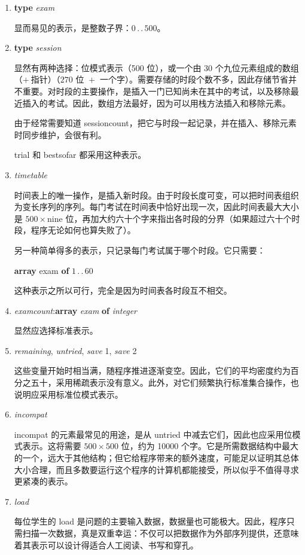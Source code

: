 \begin{enumerate}[wide, nosep, label=(\arabic*)]
	\item \textbf{type} \textit{exam}

	\noindent
	显而易见的表示，是整数子界：$0\,.\,.\,500$。

	\item \textbf{type} \textit{session}

	\noindent
	显然有两种选择：位模式表示（500 位），或一个由 30 个九位元素组成的数组（$+\ \text{指针}$）（$270 \text{ 位 } + \text{ 一个字}$）。需要存储的时段个数不多，因此存储节省并不重要。对时段的主要操作，是插入一门已知尚未在其中的考试，以及移除最近插入的考试。因此，数组方法最好，因为可以用栈方法插入和移除元素。

	由于经常需要知道 sessioncount，把它与时段一起记录，并在插入、移除元素时同步维护，会很有利。

	trial 和 bestsofar 都采用这种表示。

	\item \textit{timetable}

	\noindent
	时间表上的唯一操作，是插入新时段。由于时段长度可变，可以把时间表组织为变长序列的序列。每门考试在时间表中恰好出现一次，因此时间表最大大小是 $500 \times \text{nine}$ 位，再加大约六十个字来指出各时段的分界（如果超过六十个时段，程序无论如何也算失败了）。

	另一种简单得多的表示，只记录每门考试属于哪个时段。它只需要：

	\quad \textbf{array} exam \textbf{of} $1\,.\,.\,60$

	\noindent
	这种表示之所以可行，完全是因为时间表各时段互不相交。

	\item \textit{examcount}:\textbf{array} \textit{exam} \textbf{of} \textit{integer}

	\noindent
	显然应选择标准表示。

	\item \textit{remaining}, \textit{untried}, \textit{save} 1, \textit{save} 2

	\noindent
	这些变量开始时相当满，随程序推进逐渐变空。因此，它们的平均密度约为百分之五十，采用稀疏表示没有意义。此外，对它们频繁执行标准集合操作，也说明应采用标准位模式表示。

	\item \textit{incompat}

	\noindent
	incompat 的元素最常见的用途，是从 untried 中减去它们，因此也应采用位模式表示。这将需要 $500 \times 500 \text{ 位}$，约为 10000 个字。它是所需数据结构中最大的一个，远大于其他结构；但它给程序带来的额外速度，可能足以证明其总体大小合理，而且多数要运行这个程序的计算机都能接受，所以似乎不值得寻求更紧凑的表示。

	\item \textit{load}

	\noindent
	每位学生的 load 是问题的主要输入数据，数据量也可能极大。因此，程序只需扫描一次数据，真是双重幸运：不仅可以把数据作为外部序列提供，还意味着其表示可以设计得适合人工阅读、书写和穿孔。

\end{enumerate}

